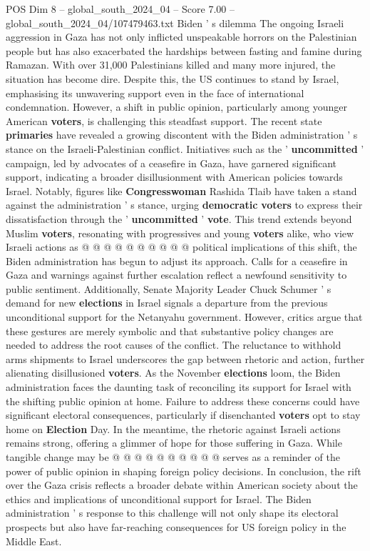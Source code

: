 \begin{textsample}{POS Dim 8 – global\_south\_2024\_04 – Score 7.00 – global\_south\_2024\_04/107479463.txt}  \label{ex:f8_pos_191}
Biden ' s dilemma The ongoing Israeli aggression in Gaza has not only inflicted unspeakable horrors on the Palestinian people but has also exacerbated the hardships between fasting and famine during Ramazan.
With over 31,000 Palestinians killed and many more injured, the situation has become dire.
Despite this, the US continues to stand by Israel, emphasising its unwavering support even in the face of international condemnation.
However, a shift in public opinion, particularly among younger American \textbf{voters}, is challenging this steadfast support.
The recent state \textbf{primaries} have revealed a growing discontent with the Biden administration ' s stance on the Israeli-Palestinian conflict.
Initiatives such as the ' \textbf{uncommitted} ' campaign, led by advocates of a ceasefire in Gaza, have garnered significant support, indicating a broader disillusionment with American policies towards Israel.
Notably, figures like \textbf{Congresswoman} Rashida Tlaib have taken a stand against the administration ' s stance, urging \textbf{democratic} \textbf{voters} to express their dissatisfaction through the ' \textbf{uncommitted} ' \textbf{vote}.
This trend extends beyond Muslim \textbf{voters}, resonating with progressives and young \textbf{voters} alike, who view Israeli actions as @ @ @ @ @ @ @ @ @ @ political implications of this shift, the Biden administration has begun to adjust its approach.
Calls for a ceasefire in Gaza and warnings against further escalation reflect a newfound sensitivity to public sentiment.
Additionally, Senate Majority Leader Chuck Schumer ' s demand for new \textbf{elections} in Israel signals a departure from the previous unconditional support for the Netanyahu government.
However, critics argue that these gestures are merely symbolic and that substantive policy changes are needed to address the root causes of the conflict.
The reluctance to withhold arms shipments to Israel underscores the gap between rhetoric and action, further alienating disillusioned \textbf{voters}.
As the November \textbf{elections} loom, the Biden administration faces the daunting task of reconciling its support for Israel with the shifting public opinion at home.
Failure to address these concerns could have significant electoral consequences, particularly if disenchanted \textbf{voters} opt to stay home on \textbf{Election} Day.
In the meantime, the rhetoric against Israeli actions remains strong, offering a glimmer of hope for those suffering in Gaza.
While tangible change may be @ @ @ @ @ @ @ @ @ @ serves as a reminder of the power of public opinion in shaping foreign policy decisions.
In conclusion, the rift over the Gaza crisis reflects a broader debate within American society about the ethics and implications of unconditional support for Israel.
The Biden administration ' s response to this challenge will not only shape its electoral prospects but also have far-reaching consequences for US foreign policy in the Middle East.

\end{textsample}
